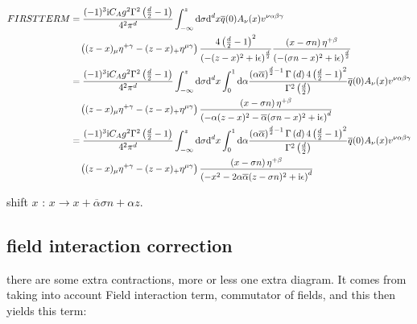 \begin{align}
	FIRSTTERM
	&=
	\frac{(-1)^3 \text{i} C_A g^2 \Gamma^2\left( \frac{d}{2} -1\right)}{4^2\pi^{d}} \int_{-\infty}^z \text{d} \sigma \text{d} ^d x  \overline q(0) A_\nu (x) v^{\nu\alpha\beta\gamma}
	\\&~~~
	\left( (z-x)_\mu \eta^{+ \gamma} - (z-x)_+ \eta^{\mu \gamma} \right) \frac{4\left(\frac{d}{2}-1\right)^2}{ \left(-(z-x)^2+\text{i}\epsilon\right)^{\frac{d}{2}}} \frac{\left( x- \sigma n \right)\eta^{+\beta}}{ \left(-(\sigma n -x)^2+\text{i}\epsilon\right)^{\frac{d}{2}}}
	\\
	&=
	\frac{(-1)^3 \text{i} C_A g^2 \Gamma^2\left( \frac{d}{2} -1\right)}{4^2\pi^{d}} \int_{-\infty}^z \text{d} \sigma \text{d} ^d x \int_0^1 \text{d} \alpha \frac{\left(\alpha\overline\alpha\right)^{\frac{d}{2}-1}\Gamma\left(d\right)4\left(\frac{d}{2}-1\right)^2}{\Gamma^2\left(\frac{d}{2}\right)} \overline q(0) A_\nu (x) v^{\nu\alpha\beta\gamma}
	\\&~~~
	\left( (z-x)_\mu \eta^{+ \gamma} - (z-x)_+ \eta^{\mu \gamma} \right)  \frac{\left( x- \sigma n \right)\eta^{+\beta}}{ \left(-\alpha(z-x)^2-\overline\alpha(\sigma n -x)^2+\text{i}\epsilon\right)^{d}}
	\\
	&=
	\frac{(-1)^3 \text{i} C_A g^2 \Gamma^2\left( \frac{d}{2} -1\right)}{4^2\pi^{d}} \int_{-\infty}^z \text{d} \sigma \text{d} ^d x \int_0^1 \text{d} \alpha \frac{\left(\alpha\overline\alpha\right)^{\frac{d}{2}-1}\Gamma\left(d\right)4\left(\frac{d}{2}-1\right)^2}{\Gamma^2\left(\frac{d}{2}\right)} \overline q(0) A_\nu (x) v^{\nu\alpha\beta\gamma}
	\\&~~~
	\left( (z-x)_\mu \eta^{+ \gamma} - (z-x)_+ \eta^{\mu \gamma} \right)  \frac{\left( x- \sigma n \right)\eta^{+\beta}}{ \left(-x^2 - 2\alpha\overline \alpha(z-\sigma n)^2+\text{i}\epsilon\right)^{d}}
\end{align}

shift $x$ : $x \rightarrow x + \overline \alpha \sigma n + \alpha z$.

\subsection{field interaction correction}

there are some extra contractions, more or less one extra diagram. It comes from taking into account Field interaction term, commutator of fields, and this then yields this term: 

